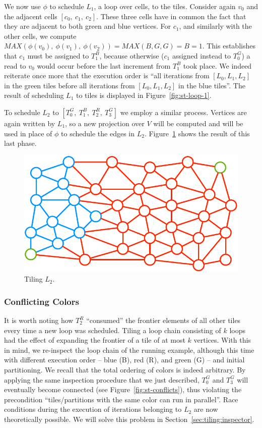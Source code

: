 We now use $\phi$ to schedule $L_1$, a loop over cells, to the tiles. Consider again $v_0$ and the adjacent cells $[c_0,\ c_1,\ c_2]$. These three cells have in common the fact that they are adjacent to both green and blue vertices. For $c_1$, and similarly with the other cells, we compute $MAX(\phi(v_0),\ \phi(v_1),\ \phi(v_2)) = MAX(B, G, G) = B = 1$. This establishes that $c_1$ must be assigned to $T_1^B$, because otherwise ($c_1$ assigned instead to $T_0^G$) a read to $v_0$ would occur before the last increment from $T_1^B$ took place. We indeed reiterate once more that the execution order is ``all iterations from $[L_0, L_1, L_2]$ in the green tiles before all iterations from $[L_0, L_1, L_2]$ in the blue tiles''. The result of scheduling $L_1$ to tiles is displayed in Figure~\ref{fig:st-loop-1}.

To schedule $L_2$ to $[T_0^G,\ T_1^B,\ T_2^R,\ T_3^G]$ we employ a similar process. Vertices are again written by $L_1$, so a new projection over $V$ will be computed and will be used in place of $\phi$ to schedule the edges in $L_2$. Figure~\ref{fig:st-loop-2} shows the result of this last phase. 

\begin{figure}[h]
\centering
\includegraphics[scale=0.7]{sparsetiling/figures/loop_2.pdf}
\caption{Tiling $L_2$.}
\label{fig:st-loop-2}
\end{figure}


\subsubsection*{Conflicting Colors}
It is worth noting how $T_2^R$ ``consumed'' the frontier elements of all other tiles every time a new loop was scheduled. Tiling a loop chain consisting of $k$ loops had the effect of expanding the frontier of a tile of at most $k$ vertices. With this in mind, we re-inspect the loop chain of the running example, although this time with different execution order -- blue (B), red (R), and green (G) -- and initial partitioning. We recall that the total ordering of colors is indeed arbitrary. By applying the same inspection procedure that we just described, $T_0^G$ and $T_3^G$ will eventually become connected (see Figure~\ref{fig:st-conflicts}), thus violating the precondition ``tiles/partitions with the same color can run in parallel''. Race conditions during the execution of iterations belonging to $L_2$ are now theoretically possible. We will solve this problem in Section~\ref{sec:tiling:inspector}.

